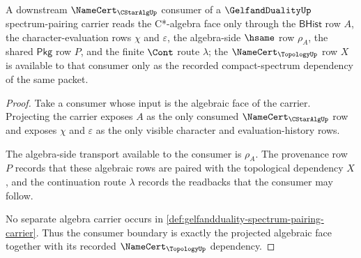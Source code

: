 \begin{theorem}
\label{thm:gelfandduality-cstaralgebra-consumer-boundary}
A downstream $\NameCert_{\CStarAlgUp}$ consumer of a $\GelfandDualityUp$
spectrum-pairing carrier reads the C*-algebra face only through the
$\mathsf{BHist}$ row $A$, the character-evaluation rows $\chi$ and
$\varepsilon$, the algebra-side $\hsame$ row $\rho_{A}$, the shared
$\mathsf{Pkg}$ row $P$, and the finite $\Cont$ route $\lambda$; the
$\NameCert_{\TopologyUp}$ row $X$ is available to that consumer only as the
recorded compact-spectrum dependency of the same packet.
\end{theorem}
\begin{proof}
Take a consumer whose input is the algebraic face of the carrier. Projecting
the carrier exposes $A$ as the only consumed $\NameCert_{\CStarAlgUp}$ row and
exposes $\chi$ and $\varepsilon$ as the only visible character and
evaluation-history rows.

The algebra-side transport available to the consumer is $\rho_{A}$. The
provenance row $P$ records that these algebraic rows are paired with the
topological dependency $X$, and the continuation route $\lambda$ records the
readbacks that the consumer may follow.

No separate algebra carrier occurs in
\autoref{def:gelfandduality-spectrum-pairing-carrier}. Thus the consumer
boundary is exactly the projected algebraic face together with its recorded
$\NameCert_{\TopologyUp}$ dependency.
\end{proof}

